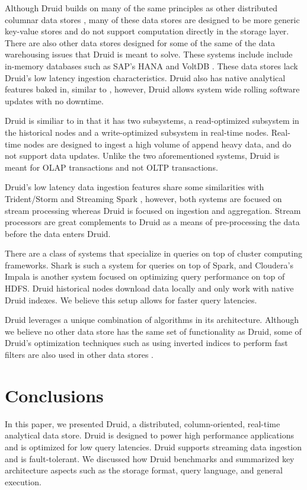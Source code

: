\documentclass{acm_proc_article-sp}
\begin{document}
Although Druid builds on many of the same principles as other distributed
columnar data stores \cite{fink2012distributed}, many of these data stores are
designed to be more generic key-value stores \cite{lakshman2010cassandra} and do not
support computation directly in the storage layer.  There are also other data
stores designed for some of the same of the data warehousing issues that Druid
is meant to solve. These systems include include in-memory databases such as
SAP’s HANA \cite{farber2012sap} and VoltDB \cite{voltdb2010voltdb}. These data
stores lack Druid's low latency ingestion characteristics. Druid also has
native analytical features baked in, similar to \cite{paraccel2013}, however,
Druid allows system wide rolling software updates with no downtime.  

Druid is similiar to \cite{stonebraker2005c, cipar2012lazybase} in that it has
two subsystems, a read-optimized subsystem in the historical nodes and a
write-optimized subsystem in real-time nodes. Real-time nodes are designed to
ingest a high volume of append heavy data, and do not support data updates.
Unlike the two aforementioned systems, Druid is meant for OLAP transactions and
not OLTP transactions.

Druid's low latency data ingestion features share some similarities with
Trident/Storm \cite{marz2013storm} and Streaming Spark
\cite{zaharia2012discretized}, however, both systems are focused on stream
processing whereas Druid is focused on ingestion and aggregation. Stream
processors are great complements to Druid as a means of pre-processing the data
before the data enters Druid.

There are a class of systems that specialize in queries on top of cluster
computing frameworks.  Shark \cite{engle2012shark} is such a system for queries
on top of Spark, and Cloudera's Impala \cite{cloudera2013} is another system
focused on optimizing query performance on top of HDFS. Druid historical nodes
download data locally and only work with native Druid indexes. We believe this
setup allows for faster query latencies.

Druid leverages a unique combination of algorithms in its
architecture. Although we believe no other data store has the same set
of functionality as Druid, some of Druid’s optimization techniques such as using
inverted indices to perform fast filters are also used in other data
stores \cite{macnicol2004sybase}.

\section{Conclusions}
\label{sec:conclusions}
In this paper, we presented Druid, a distributed, column-oriented, real-time
analytical data store. Druid is designed to power high performance applications
and is optimized for low query latencies. Druid supports streaming data
ingestion and is fault-tolerant. We discussed how Druid benchmarks and
summarized key architecture aspects such
as the storage format, query language, and general execution.
\end{document}
